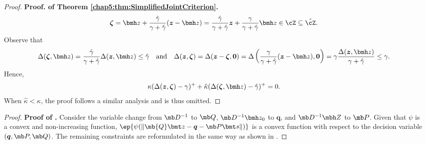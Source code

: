 \documentclass[mnsc, nonblindrev]{informswp}
\newcommand{\1}[1]{\mathds{1}{\left(#1\right)}}
\begin{document}
\begin{appendices}
\begin{proof}{\bf Proof. of Theorem \ref{chap5:thm:SimplifiedJointCriterion}.}
$$
\bm \zeta = \bmh z + \frac{\hat \gamma}{\gamma +\hat\gamma }(\bm z - \bmh z) =  \frac{\hat \gamma}{\gamma +\hat\gamma }\bm z + \frac{\gamma}{\gamma +\hat\gamma }\bmh z \in \cZ \subseteq \hat \cZ. 
$$
Observe that 
$$
\Delta(\bm \zeta,\bmh z) = \frac{\hat \gamma}{\gamma +\hat\gamma } \Delta(\bm z,\bmh z) \leq \hat \gamma
~~~\text{and}~~~
\Delta(\bm z,\bm \zeta)=\Delta(\bm z - \bm \zeta,\bm 0) = \Delta\left(  \frac{\gamma}{\gamma +\hat\gamma }(\bm z - \bmh z),\bm 0\right) = \gamma \frac{\Delta(\bm z,\bmh z)}{\gamma + \hat \gamma} \leq \gamma.
$$
Hence,
$$
\kappa (  \Delta(\bm z,\bm \zeta) - \gamma)^+ + \hat \kappa ( \Delta(\bm \zeta,\bmh z) - \hat \gamma)^+ = 0. 
$$
When $\hat \kappa < \kappa$, the proof follows a similar analysis and is thus omitted.
\hfill \Halmos
\end{proof}
\vspace{3mm}

\begin{proof}{\bf Proof of .}
Consider the variable change from $\mb D^{-1}$ to $\mb Q$, $\mb D^{-1} \bmh z_0$ to $\bm q$, and $\mb D^{-1} \mbh Z$ to $\mb P$. Given that $\psi$ is a convex and non-increasing function, $\ep{\psi(\|\mb{Q} \bmt z - \bm q - \mb P \bmt s\|)}$ is a convex function with respect to the decision variable $(\bm q,\mb P,\mb Q)$. The remaining constraints are reformulated in the same way as shown in .
\hfill \Halmos
\end{proof}
\vspace{3mm}


\end{appendices}
\end{document}
